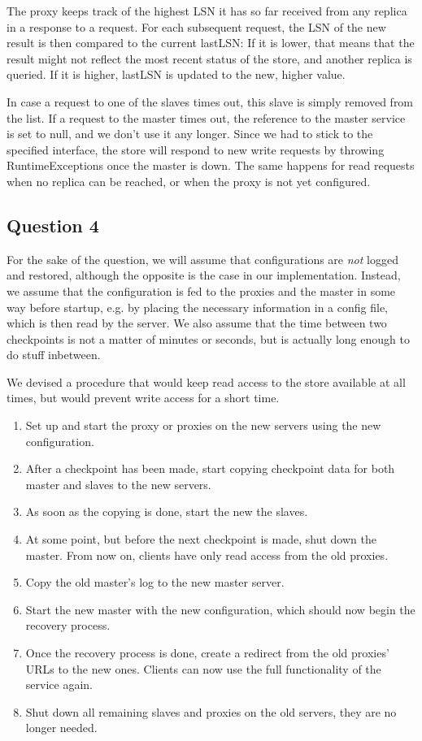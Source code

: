 \documentclass[12pt,a4paper,fleqn]{article}
\begin{document}
The proxy keeps track of the highest LSN it has so far received from any replica in a response to a request. For each subsequent request, the LSN of the new result is then compared to the current lastLSN: If it is lower, that means that the result might not reflect the most recent status of the store, and another replica is queried. If it is higher, lastLSN is updated to the new, higher value. 

In case a request to one of the slaves times out, this slave is simply removed from the list. If a request to the master times out, the reference to the master service is set to null, and we don't use it any longer. Since we had to stick to the specified interface, the store will respond to new write requests by throwing RuntimeExceptions once the master is down. The same happens for read requests when no replica can be reached, or when the proxy is not yet configured.

\subsection*{Question 4}
\label{sec:pq4}
For the sake of the question, we will assume that configurations are \emph{not} logged and restored, although the opposite is the case in our implementation. Instead, we assume that the configuration is fed to the proxies and the master in some way before startup, e.g. by placing the necessary information in a config file, which is then read by the server. We also assume that the time between two checkpoints is not a matter of minutes or seconds, but is actually long enough to do stuff inbetween.

We devised a procedure that would keep read access to the store available at all times, but would prevent write access for a short time. 
\begin{enumerate}
  \item Set up and start the proxy or proxies on the new servers using the new configuration.
  \item After a checkpoint has been made, start copying checkpoint data for both master and slaves to the new servers.
  \item As soon as the copying is done, start the new the slaves.
  \item At some point, but before the next checkpoint is made, shut down the master. From now on, clients have only read access from the old proxies. \label{writestop}
  \item Copy the old master's log to the new master server.
  \item Start the new master with the new configuration, which should now begin the recovery process. \label{writestart}
  \item Once the recovery process is done, create a redirect from the old proxies' URLs to the new ones. Clients can now use the full functionality of the service again. 
  \item Shut down all remaining slaves and proxies on the old servers, they are no longer needed.
\end{enumerate}
\end{document}
